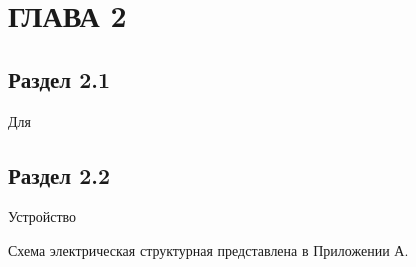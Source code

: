 \chapter[Глава 2]{ГЛАВА 2}

\section{Раздел 2.1}
\hspace*{12.5 mm}Для

\section{Раздел 2.2}
\hspace*{12.5 mm}Устройство

Схема электрическая структурная представлена в Приложении А.